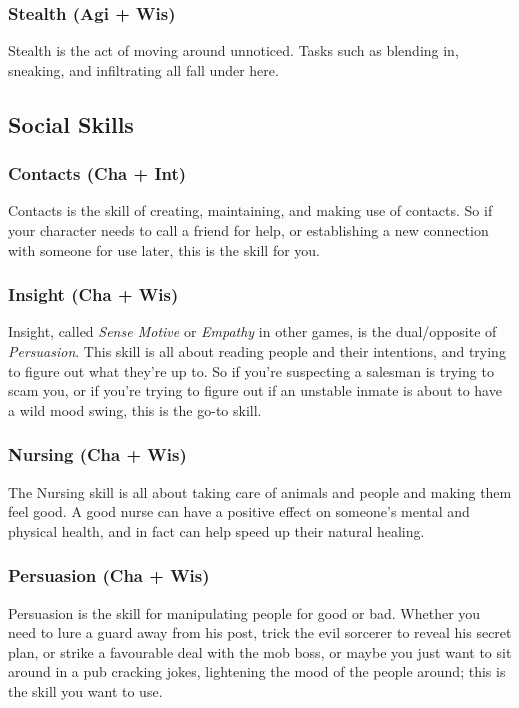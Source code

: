 \subsubsection{Stealth (Agi + Wis)}
Stealth is the act of moving around unnoticed.
Tasks such as blending in, sneaking, and infiltrating all fall under here.

\subsection{Social Skills}
\subsubsection{Contacts (Cha + Int)}
Contacts is the skill of creating, maintaining, and making use of contacts.
So if your character needs to call a friend for help, or establishing a new connection with someone for use later, this is the skill for you.

\subsubsection{Insight (Cha + Wis)}
Insight, called \textit{Sense Motive} or \textit{Empathy} in other games, is the dual/opposite of \textit{Persuasion}. 
This skill is all about reading people and their intentions, and trying to figure out what they're up to.
So if you're suspecting a salesman is trying to scam you, or if you're trying to figure out if an unstable inmate is about to have a wild mood swing, this is the go-to skill.

\subsubsection{Nursing (Cha + Wis)}
The Nursing skill is all about taking care of animals and people and making them feel good.
A good nurse can have a positive effect on someone's mental and physical health, and in fact can help speed up their natural healing.

\subsubsection{Persuasion (Cha + Wis)}
Persuasion is the skill for manipulating people for good or bad.
Whether you need to lure a guard away from his post, trick the evil sorcerer to reveal his secret plan, or strike a favourable deal with the mob boss, or maybe you just want to sit around in a pub cracking jokes, lightening the mood of the people around; this is the skill you want to use.

